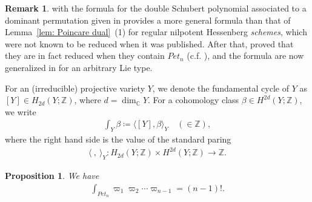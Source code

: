 \documentclass[11pt]{article}
\newtheorem{prop}[theo]{Proposition}
\theoremstyle{definition}
\newtheorem{rema}[theo]{Remark}
\numberwithin{equation}{section}
\numberwithin{equation}{section}
\begin{document}
\begin{rema}
{\rm
\cite[Corollary~7.2]{an-ty} with the formula for the double Schubert polynomial associated to a dominant permutation given in \cite[p.2613]{an-ty} provides a more general formula than that of Lemma~\ref{lem: Poincare dual}~(1) for regular nilpotent Hessenberg \textit{schemes}, which were not known to be reduced when it was published. After that, \cite{ab-de-ga-ha} proved that they are in fact reduced when they contain $Pet_{n}$ (c.f. \cite[Remark~3.8]{ab-de-ga-ha}), and the formula are now generalized in \cite{ab-fu-ze} for an arbitrary Lie type.
}
\end{rema}

For an (irreducible) projective variety $Y$, we denote the fundamental cycle of $Y$ as $[Y]\in H_{2d}(Y;{\mathbb Z})$, where $d=\dim_{{\mathbb C}} Y$. For a cohomology class $\beta\in H^{2d}(Y;{\mathbb Z})$, we write
\begin{align*}
\int_Y \beta \coloneqq \langle [Y] , \beta \rangle_{Y} \quad (\in{\mathbb Z}), 
\end{align*} 
where the right hand side is the value of the standard paring
\begin{align*}
\langle \ , \ \rangle_{Y} \colon  H_{2d}(Y;{\mathbb Z}) \times H^{2d}(Y;{\mathbb Z}) \rightarrow {\mathbb Z}.
\end{align*}

\begin{prop}\label{lem: Masuda lemma in fund}
We have
\begin{align*}
\int_{Pet_{n}}\varpi_1\varpi_2\cdots \varpi_{n-1} = (n-1)! .
\end{align*}
\end{prop}
\end{document}
